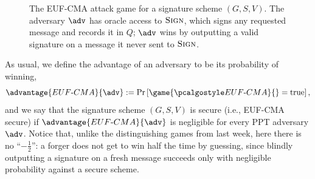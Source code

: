 \documentclass[12pt]{article}
\newcommand{\pr}[1]{\text{Pr}\left[#1\right]}
\theoremstyle{definition}
\theoremstyle{remark}
\theoremstyle{definition}
\begin{document}
\begin{figure}[tbhp]
  \begin{minipage}[t]{0.5\textwidth}\begin{flushright}
    \begin{tcolorbox}[width=6cm]
      \begin{pchstack}[center]
      \end{pchstack}
    \end{tcolorbox}\end{flushright}\end{minipage}\begin{minipage}[t]{0.5\textwidth}
    \begin{tcolorbox}[width=5cm]
      \begin{pchstack}[center]
      \end{pchstack}
    \end{tcolorbox}
  \end{minipage}
  \caption{The EUF-CMA attack game for a signature scheme $(G,S,V)$. The adversary $\adv$ has oracle access to ${\normalfont\textsc{Sign}}$, which signs any requested message and records it in $Q$; $\adv$ wins by outputting a valid signature on a message it never sent to ${\normalfont\textsc{Sign}}$.\label{fig:eufcma}}
\end{figure}

As usual, we define the advantage of an adversary to be its probability of winning, $$\advantage{EUF\text{-}CMA}{\adv} := \pr{\game{\algo{EUF\text{-}CMA}}{} = \text{true}},$$ and we say that the signature scheme $(G, S, V)$ is secure (i.e., EUF-CMA secure) if $\advantage{EUF\text{-}CMA}{\adv}$ is negligible for every PPT adversary $\adv$. Notice that, unlike the distinguishing games from last week, here there is no ``$-\frac{1}{2}$'': a forger does not get to win half the time by guessing, since blindly outputting a signature on a fresh message succeeds only with negligible probability against a secure scheme.\\
\end{document}
